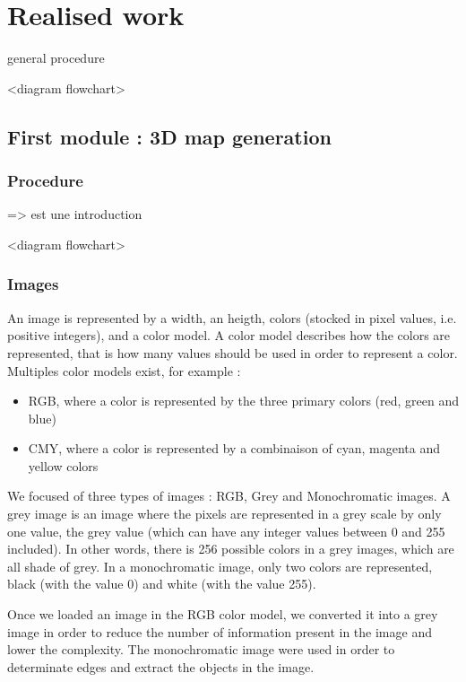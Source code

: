 \chapter{Realised work}

general procedure 

<diagram flowchart>


\section{First module : 3D map generation}


\subsection{Procedure}

=> est une introduction 

<diagram flowchart>


\subsection{Images}

An image is represented by a width, an heigth, colors (stocked in pixel values, i.e. positive integers), and a color model. A color model describes how the colors are represented, that is how many values should be used in order to represent a color. Multiples color models exist, for example : 
\begin{itemize}
	\item RGB, where a color is represented by the three primary colors (red, green and blue)
	\item CMY, where a color is represented by a combinaison of cyan, magenta and yellow colors
\end{itemize}


We focused of three types of images : RGB, Grey and Monochromatic images. A grey image is an image where the pixels are represented in a grey scale by only one value, the grey value (which can have any integer values between 0 and 255 included). In other words, there is 256 possible colors in a grey images, which are all shade of grey. In a monochromatic image, only two colors are represented, black (with the value 0) and white (with the value 255).

Once we loaded an image in the RGB color model, we converted it into a grey image in order to reduce the number of information present in the image and lower the complexity. The monochromatic image were used in order to determinate edges and extract the objects in the image.

